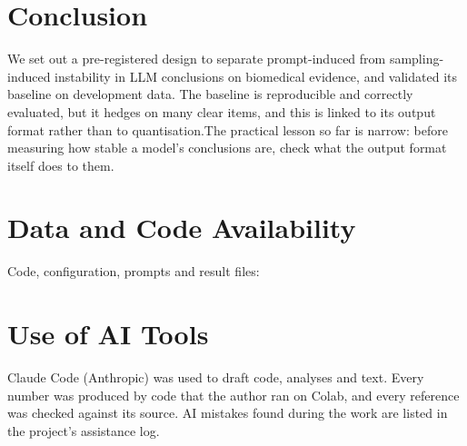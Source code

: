 \documentclass[conference]{IEEEtran}
\begin{document}
\section{Conclusion}
We set out a pre-registered design to separate prompt-induced from
sampling-induced instability in LLM conclusions on biomedical evidence,
and validated its baseline on development data. The baseline is
reproducible and correctly evaluated, but it hedges on many clear items,
and this is linked to its output format rather than to quantisation.The
practical lesson so far is narrow: before measuring how stable a model's
conclusions are, check what the output format itself does to them.

\section*{Data and Code Availability}
Code, configuration, prompts and result files:

\section*{Use of AI Tools}
Claude Code (Anthropic) was used to draft code, analyses and text. Every
number was produced by code that the author ran on Colab, and every
reference was checked against its source. AI mistakes found during the
work are listed in the project's assistance log.



\end{document}
